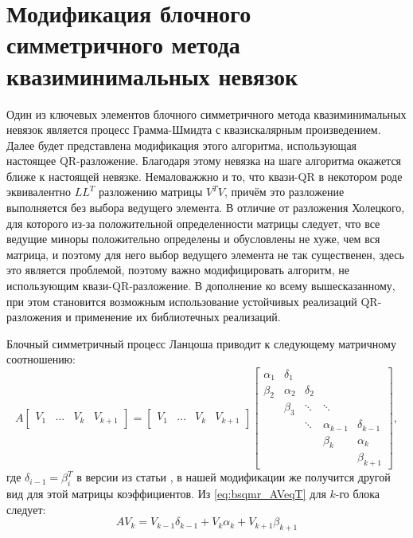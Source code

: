 \section{Модификация блочного симметричного метода квазиминимальных невязок}
\label{sec:bsqmr_mod} 

\par Один из ключевых элементов блочного симметричного метода квазиминимальных невязок \cite{doi:10.1137/0917019}
является процесс Грамма-Шмидта с квазискалярным произведением. Далее будет представлена модификация 
этого алгоритма, использующая настоящее QR-разложение. Благодаря этому невязка на 
шаге алгоритма окажется ближе к настоящей невязке. Немаловажжно и то, что квази-QR 
в некотором роде эквивалентно $LL^T$ разложению матрицы $V^T V$, причём это разложение
выполняется без выбора ведущего элемента. В отличие от разложения Холецкого, для которого из-за
положительной определенности матрицы следует, что все ведущие миноры положительно определены и 
обусловлены не хуже, чем вся матрица, и поэтому для него выбор ведущего элемента не так существенен,
здесь это является проблемой, поэтому важно модифицировать алгоритм, не использующим квази-QR-разложение. 
В дополнение ко всему вышесказанному, при этом становится возможным использование 
устойчивых реализаций QR-разложения и применение их библиотечных реализаций.

\par Блочный симметричный процесс Ланцоша приводит к следующему матричному соотношению:
\begin{equation}
    \label{eq:bsqmr_AVeqT}
    A \begin{bmatrix}
        V_1 & ... & V_k & V_{k+1} 
    \end{bmatrix} = \begin{bmatrix}
        V_1 & ... & V_k & V_{k+1} 
    \end{bmatrix} \begin{bmatrix}
        \alpha_1 & \delta_1 & & & \\
        \beta_2 & \alpha_2 & \delta_2 & & \\
        & \beta_3 & \ddots & \ddots & \\
        & & \ddots & \alpha_{k-1} & \delta_{k-1} \\
        & & & \beta_k & \alpha_k \\
        & & & & \beta_{k+1}
    \end{bmatrix},
\end{equation} 
где $\delta_{i-1} = \beta_i^T$ в версии из статьи \cite{doi:10.1137/0917019}, в нашей
модификации же получится другой вид для этой матрицы коэффициентов. Из \eqref{eq:bsqmr_AVeqT} для $k$-го блока следует: 
\begin{equation}
    \label{eq:bsqmr_last_block}
    AV_k = V_{k-1}\delta_{k-1} + V_k \alpha_k + V_{k+1} \beta_{k+1}
\end{equation}

